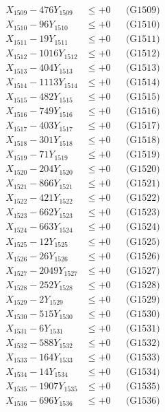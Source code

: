 \documentclass[a4paper,10pt]{article}
\begin{document}
{\begin{align}
X_{1509} - 476Y_{1509} &\leq +0 && \text{(G1509)} \\
X_{1510} - 96Y_{1510} &\leq +0 && \text{(G1510)} \\
\allowbreak
X_{1511} - 19Y_{1511} &\leq +0 && \text{(G1511)} \\
X_{1512} - 1016Y_{1512} &\leq +0 && \text{(G1512)} \\
X_{1513} - 404Y_{1513} &\leq +0 && \text{(G1513)} \\
X_{1514} - 1113Y_{1514} &\leq +0 && \text{(G1514)} \\
X_{1515} - 482Y_{1515} &\leq +0 && \text{(G1515)} \\
X_{1516} - 749Y_{1516} &\leq +0 && \text{(G1516)} \\
X_{1517} - 403Y_{1517} &\leq +0 && \text{(G1517)} \\
X_{1518} - 301Y_{1518} &\leq +0 && \text{(G1518)} \\
X_{1519} - 71Y_{1519} &\leq +0 && \text{(G1519)} \\
X_{1520} - 204Y_{1520} &\leq +0 && \text{(G1520)} \\
\allowbreak
X_{1521} - 866Y_{1521} &\leq +0 && \text{(G1521)} \\
X_{1522} - 421Y_{1522} &\leq +0 && \text{(G1522)} \\
X_{1523} - 662Y_{1523} &\leq +0 && \text{(G1523)} \\
X_{1524} - 663Y_{1524} &\leq +0 && \text{(G1524)} \\
X_{1525} - 12Y_{1525} &\leq +0 && \text{(G1525)} \\
X_{1526} - 26Y_{1526} &\leq +0 && \text{(G1526)} \\
X_{1527} - 2049Y_{1527} &\leq +0 && \text{(G1527)} \\
X_{1528} - 252Y_{1528} &\leq +0 && \text{(G1528)} \\
X_{1529} - 2Y_{1529} &\leq +0 && \text{(G1529)} \\
X_{1530} - 515Y_{1530} &\leq +0 && \text{(G1530)} \\
\allowbreak
X_{1531} - 6Y_{1531} &\leq +0 && \text{(G1531)} \\
X_{1532} - 588Y_{1532} &\leq +0 && \text{(G1532)} \\
X_{1533} - 164Y_{1533} &\leq +0 && \text{(G1533)} \\
X_{1534} - 14Y_{1534} &\leq +0 && \text{(G1534)} \\
X_{1535} - 1907Y_{1535} &\leq +0 && \text{(G1535)} \\
X_{1536} - 696Y_{1536} &\leq +0 && \text{(G1536)} \\

\end{align}}
\end{document}
